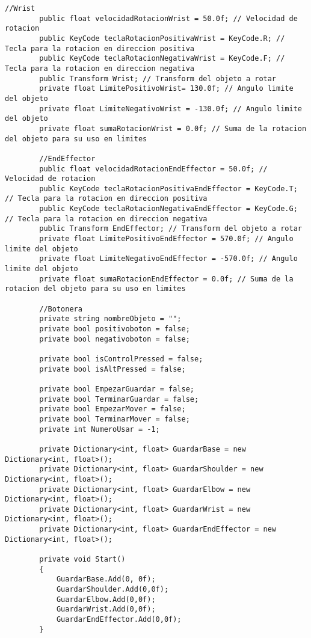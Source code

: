 \begin{lstlisting}[frame=single]
        //Wrist
        public float velocidadRotacionWrist = 50.0f; // Velocidad de rotacion
        public KeyCode teclaRotacionPositivaWrist = KeyCode.R; // Tecla para la rotacion en direccion positiva
        public KeyCode teclaRotacionNegativaWrist = KeyCode.F; // Tecla para la rotacion en direccion negativa
        public Transform Wrist; // Transform del objeto a rotar
        private float LimitePositivoWrist= 130.0f; // Angulo limite del objeto
        private float LimiteNegativoWrist = -130.0f; // Angulo limite del objeto
        private float sumaRotacionWrist = 0.0f; // Suma de la rotacion del objeto para su uso en limites

        //EndEffector
        public float velocidadRotacionEndEffector = 50.0f; // Velocidad de rotacion
        public KeyCode teclaRotacionPositivaEndEffector = KeyCode.T; // Tecla para la rotacion en direccion positiva
        public KeyCode teclaRotacionNegativaEndEffector = KeyCode.G; // Tecla para la rotacion en direccion negativa
        public Transform EndEffector; // Transform del objeto a rotar
        private float LimitePositivoEndEffector = 570.0f; // Angulo limite del objeto
        private float LimiteNegativoEndEffector = -570.0f; // Angulo limite del objeto
        private float sumaRotacionEndEffector = 0.0f; // Suma de la rotacion del objeto para su uso en limites

        //Botonera
        private string nombreObjeto = "";
        private bool positivoboton = false;
        private bool negativoboton = false;

        private bool isControlPressed = false;
        private bool isAltPressed = false;

        private bool EmpezarGuardar = false;
        private bool TerminarGuardar = false;
        private bool EmpezarMover = false;
        private bool TerminarMover = false;
        private int NumeroUsar = -1;

        private Dictionary<int, float> GuardarBase = new Dictionary<int, float>();
        private Dictionary<int, float> GuardarShoulder = new Dictionary<int, float>();
        private Dictionary<int, float> GuardarElbow = new Dictionary<int, float>();
        private Dictionary<int, float> GuardarWrist = new Dictionary<int, float>();
        private Dictionary<int, float> GuardarEndEffector = new Dictionary<int, float>();

        private void Start()
        {
            GuardarBase.Add(0, 0f);
            GuardarShoulder.Add(0,0f);
            GuardarElbow.Add(0,0f);
            GuardarWrist.Add(0,0f);
            GuardarEndEffector.Add(0,0f);
        }


\end{lstlisting}
